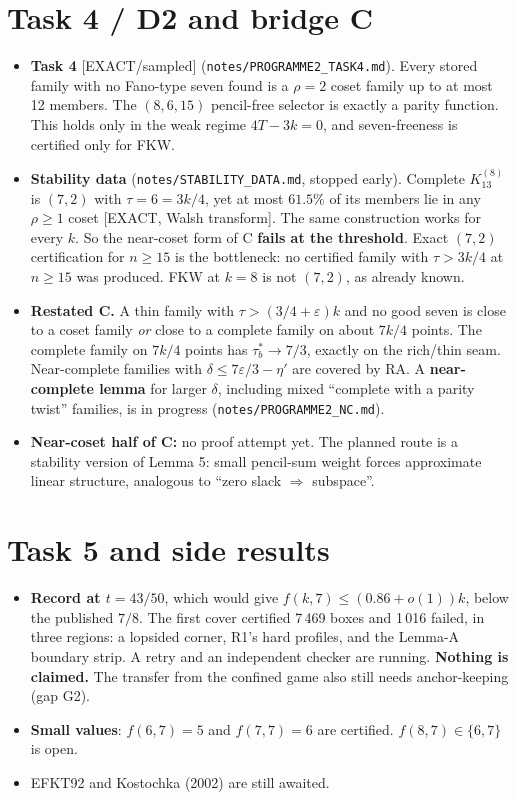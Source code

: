 \documentclass[11pt]{article}
\newcommand{\lvl}[1]{\textsf{\small[#1]}}
\begin{document}
\section{Task 4 / D2 and bridge C}
\begin{itemize}
\item \textbf{Task 4} \lvl{EXACT/sampled} (\texttt{notes/PROGRAMME2\_TASK4.md}). Every stored family with no Fano-type
seven found is a $\rho=2$ coset family up to at most 12 members. The $(8,6,15)$ pencil-free selector is exactly a parity
function. This holds only in the weak regime $4T-3k=0$, and seven-freeness is certified only for FKW.
\item \textbf{Stability data} (\texttt{notes/STABILITY\_DATA.md}, stopped early). Complete $K_{13}^{(8)}$ is $(7,2)$ with
$\tau=6=3k/4$, yet at most $61.5\%$ of its members lie in any $\rho\ge1$ coset \lvl{EXACT, Walsh transform}. The same
construction works for every $k$. So the near-coset form of C \textbf{fails at the threshold}. Exact $(7,2)$ certification
for $n\ge15$ is the bottleneck: no certified family with $\tau>3k/4$ at $n\ge15$ was produced. FKW at $k=8$ is not $(7,2)$,
as already known.
\item \textbf{Restated C.} A thin family with $\tau>(3/4+\varepsilon)k$ and no good seven is close to a coset family
\emph{or} close to a complete family on about $7k/4$ points. The complete family on $7k/4$ points has
$\tau^*_b\to7/3$, exactly on the rich/thin seam. Near-complete families with $\delta\le7\varepsilon/3-\eta'$ are covered
by RA. A \textbf{near-complete lemma} for larger $\delta$, including mixed ``complete with a parity twist'' families, is
in progress (\texttt{notes/PROGRAMME2\_NC.md}).
\item \textbf{Near-coset half of C:} no proof attempt yet. The planned route is a stability version of Lemma 5:
small pencil-sum weight forces approximate linear structure, analogous to ``zero slack $\Rightarrow$ subspace''.
\end{itemize}

\section{Task 5 and side results}
\begin{itemize}
\item \textbf{Record at $t=43/50$}, which would give $f(k,7)\le(0.86+o(1))k$, below the published $7/8$. The first cover
certified 7\,469 boxes and 1\,016 failed, in three regions: a lopsided corner, R1's hard profiles, and the Lemma-A boundary
strip. A retry and an independent checker are running. \textbf{Nothing is claimed.} The transfer from the confined game
also still needs anchor-keeping (gap G2).
\item \textbf{Small values}: $f(6,7)=5$ and $f(7,7)=6$ are certified. $f(8,7)\in\{6,7\}$ is open.
\item EFKT92 and Kostochka (2002) are still awaited.
\end{itemize}
\end{document}
